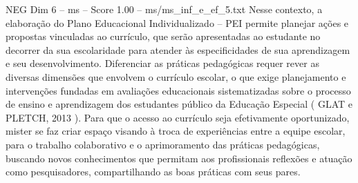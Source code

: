 \begin{textsample}{NEG Dim 6 – ms – Score 1.00 – ms/ms\_inf\_e\_ef\_5.txt}
Nesse contexto, a elaboração do Plano Educacional Individualizado – PEI permite planejar ações e propostas vinculadas ao currículo, que serão apresentadas ao estudante no decorrer da sua escolaridade para atender às especificidades de sua aprendizagem e seu desenvolvimento.
Diferenciar as práticas pedagógicas requer rever as diversas dimensões que envolvem o currículo escolar, o que exige planejamento e intervenções fundadas em avaliações educacionais sistematizadas sobre o processo de ensino e aprendizagem dos estudantes público da Educação Especial ( GLAT e PLETCH, 2013 ).
Para que o acesso ao currículo seja efetivamente oportunizado, mister se faz criar espaço visando à troca de experiências entre a equipe escolar, para o trabalho colaborativo e o aprimoramento das práticas pedagógicas, buscando novos conhecimentos que permitam aos profissionais reflexões e atuação como pesquisadores, compartilhando as boas práticas com seus pares.

\end{textsample}
